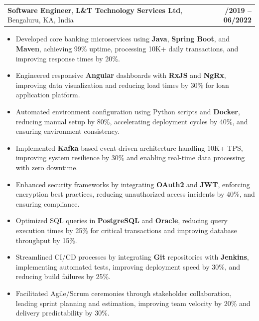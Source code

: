 \documentclass[letterpaper,11pt]{article}
\makeatletter
\newcommand{\resumeItem}[1]{
  \item\footnotesize{
    {#1 \vspace{-2pt}}
  }
}
\newcommand{\resumeSubheading}[4]{
  \vspace{-2pt}\item
    \begin{tabular*}{1.0\textwidth}[t]{l@{\extracolsep{\fill}}r}
      \textbf{\fontsize{10pt}{14pt}\selectfont #3}, \textbf{\fontsize{10pt}{14pt}\selectfont #1}, \fontsize{10pt}{14pt}\selectfont #4 & \textbf{\fontsize{10pt}{14pt}\selectfont #2} \\
    \end{tabular*}\vspace{-7pt}
}
\newcommand{\resumeItemListStart}{\begin{itemize}[leftmargin=*]}
\newcommand{\resumeItemListEnd}{\end{itemize}\vspace{-5pt}}
\makeatother
\begin{document}
    \resumeSubheading
        {L\&T Technology Services Ltd}{08/2019 -- 06/2022}
        {Software Engineer}{Bengaluru, KA, India}
      \resumeItemListStart
        \resumeItem{Developed core banking microservices using \textbf{Java}, \textbf{Spring Boot}, and \textbf{Maven}, achieving 99\% uptime, processing 10K+ daily transactions, and improving response times by 20\%.}
        \resumeItem{Engineered responsive \textbf{Angular} dashboards with \textbf{RxJS} and \textbf{NgRx}, improving data visualization and reducing load times by 30\% for loan application platform.}
        \resumeItem{Automated environment configuration using Python scripts and \textbf{Docker}, reducing manual setup by 80\%, accelerating deployment cycles by 40\%, and ensuring environment consistency.}
        \resumeItem{Implemented \textbf{Kafka}-based event-driven architecture handling 10K+ TPS, improving system resilience by 30\% and enabling real-time data processing with zero downtime.}
        \resumeItem{Enhanced security frameworks by integrating \textbf{OAuth2} and \textbf{JWT}, enforcing encryption best practices, reducing unauthorized access incidents by 40\%, and ensuring compliance.}
        \resumeItem{Optimized SQL queries in \textbf{PostgreSQL} and \textbf{Oracle}, reducing query execution times by 25\% for critical transactions and improving database throughput by 15\%.}
        \resumeItem{Streamlined CI/CD processes by integrating \textbf{Git} repositories with \textbf{Jenkins}, implementing automated tests, improving deployment speed by 30\%, and reducing build failures by 25\%.}
        \resumeItem{Facilitated Agile/Scrum ceremonies through stakeholder collaboration, leading sprint planning and estimation, improving team velocity by 20\% and delivery predictability by 30\%.}
      \resumeItemListEnd
\end{document}
